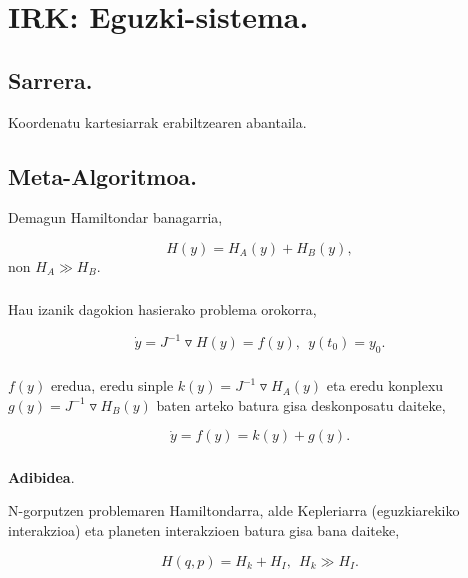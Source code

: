 \chapter{IRK: Eguzki-sistema.}

\section{Sarrera.}

Koordenatu kartesiarrak erabiltzearen abantaila.

\section{Meta-Algoritmoa.}

Demagun Hamiltondar banagarria,

\begin{equation*}
H(y)=H_A(y)+H_B(y),
\end{equation*}
non $H_A \gg H_B$. 

\paragraph*{}Hau izanik dagokion hasierako problema orokorra,

\begin{equation*}
\dot{y}=J^{-1}\triangledown H(y)=f(y) , \ \ y(t_0)=y_0.
\end{equation*}

\paragraph*{}$f(y)$ eredua, eredu sinple $k(y)=J^{-1}\triangledown H_A(y)$ eta eredu konplexu $g(y)=J^{-1}\triangledown H_B(y)$ baten arteko batura gisa deskonposatu daiteke,

\begin{equation*}
\dot{y}=f(y)=k(y)+g(y).
\end{equation*} 


\paragraph*{} \textbf{Adibidea}.

N-gorputzen problemaren Hamiltondarra, alde Kepleriarra (eguzkiarekiko interakzioa) eta planeten interakzioen batura gisa bana daiteke,

\begin{equation*}
H(q,p)=H_k+H_I, \ \ H_k \gg H_I.
\end{equation*}  

